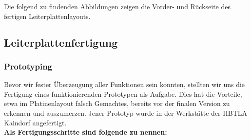 Die folgend zu findenden Abbildungen zeigen die Vorder- und Rückseite des fertigen Leiterplattenlayouts.

\subsection{Leiterplattenfertigung}

\subsubsection{Prototyping}

Bevor wir fester Überzeugung aller Funktionen sein konnten, stellten wir uns die Fertigung eines funktionierenden Prototypen als Aufgabe.
Dies hat die Vorteile, etwa im Platinenlayout falsch Gemachtes, bereits vor der finalen Version zu erkennen und auszumerzen.
Jener Prototyp wurde in der Werkstätte der HBTLA Kaindorf angefertigt. \\

\textbf{Als Fertigungsschritte sind folgende zu nennen:}

